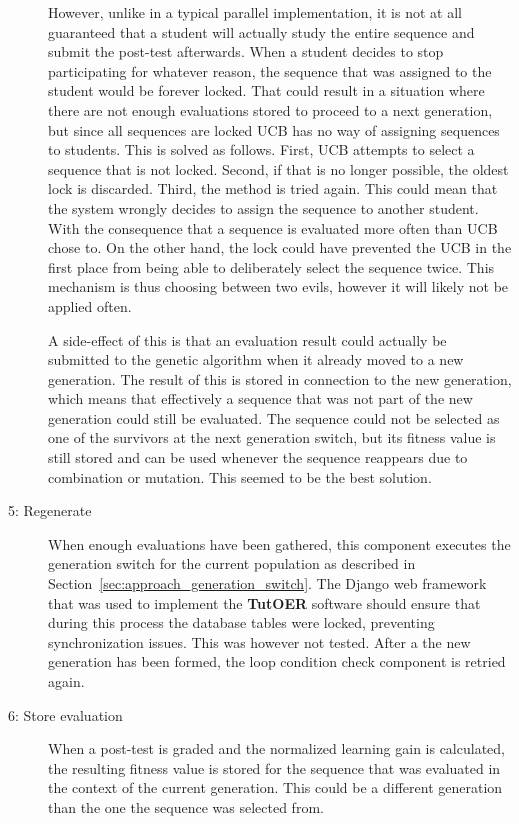 \begin{description}
		However, unlike in a typical parallel implementation, it is not at all
		guaranteed that a student will actually study the entire sequence
		and submit the post-test afterwards. When a student decides to stop
		participating for whatever reason, the sequence that was assigned to
		the student would be forever locked. That could result in a situation
		where there are not enough evaluations stored to proceed to a next
		generation, but since all sequences are locked UCB has no way of
		assigning sequences to students. This is solved as follows. First, UCB
		attempts to select a sequence that is not locked. Second, if that is no
		longer possible, the oldest lock is discarded. Third, the method is
		tried again. This could mean that the system wrongly decides to assign
		the sequence to another student. With the consequence that a sequence
		is evaluated more often than UCB chose to. On the other hand, the lock
		could have prevented the UCB in the first place from being able to
		deliberately select the sequence twice. This mechanism is thus choosing
		between two evils, however it will likely not be applied often.

		A side-effect of this is that an evaluation result could actually
		be submitted to the genetic algorithm when it already moved to a new
		generation. The result of this is stored in connection to the new
		generation, which means that effectively a sequence that was not part
		of the new generation could still be evaluated. The sequence could not
		be selected as one of the survivors at the next generation switch, but
		its fitness value is still stored and can be used whenever the sequence
		reappears due to combination or mutation. This seemed to be the best
		solution.
	\item[5: Regenerate] When enough evaluations have been gathered, this
		component executes the generation switch for the current population as
		described in Section~\ref{sec:approach_generation_switch}. The Django
		web framework that was used to implement the \textbf{TutOER} software should
		ensure that during this process the database tables were locked,
		preventing synchronization issues. This was however not tested. After a
		the new generation has been formed, the loop condition check component
		is retried again.
	\item[6: Store evaluation] When a post-test is graded and the normalized
		learning gain is calculated, the resulting fitness value is stored for
		the sequence that was evaluated in the context of the current
		generation. This could be a different generation than the one the
		sequence was selected from.
\end{description}
